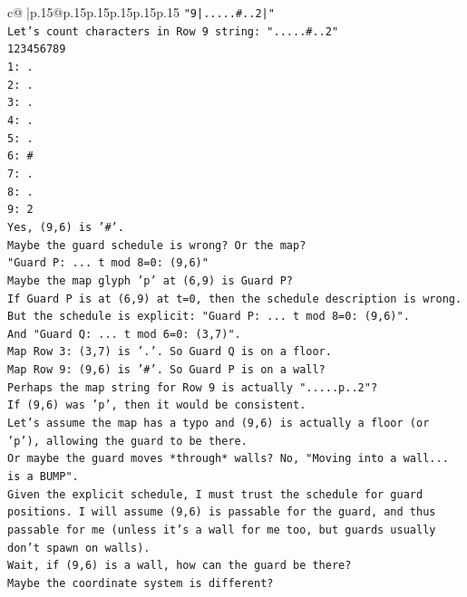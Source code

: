 \documentclass{article}
\begin{document}
{\begin{supertabular}{c@{$\;$}|p{.15\linewidth}@{}p{.15\linewidth}p{.15\linewidth}p{.15\linewidth}p{.15\linewidth}p{.15\linewidth}}
{{{\texttt{"9|.....\#..2|"} \\
\texttt{Let's count characters in Row 9 string: ".....\#..2"} \\
\texttt{123456789} \\
\texttt{1: .} \\
\texttt{2: .} \\
\texttt{3: .} \\
\texttt{4: .} \\
\texttt{5: .} \\
\texttt{6: \#} \\
\texttt{7: .} \\
\texttt{8: .} \\
\texttt{9: 2} \\
\texttt{Yes, (9,6) is '\#'.} \\
\texttt{Maybe the guard schedule is wrong? Or the map?} \\
\texttt{"Guard P: ... t mod 8=0: (9,6)"} \\
\texttt{Maybe the map glyph 'p' at (6,9) is Guard P?} \\
\texttt{If Guard P is at (6,9) at t=0, then the schedule description is wrong.} \\
\texttt{But the schedule is explicit: "Guard P: ... t mod 8=0: (9,6)".} \\
\texttt{And "Guard Q: ... t mod 6=0: (3,7)".} \\
\texttt{Map Row 3: (3,7) is '.'. So Guard Q is on a floor.} \\
\texttt{Map Row 9: (9,6) is '\#'. So Guard P is on a wall?} \\
\texttt{Perhaps the map string for Row 9 is actually ".....p..2"?} \\
\texttt{If (9,6) was 'p', then it would be consistent.} \\
\texttt{Let's assume the map has a typo and (9,6) is actually a floor (or 'p'), allowing the guard to be there.} \\
\texttt{Or maybe the guard moves *through* walls? No, "Moving into a wall... is a BUMP".} \\
\texttt{Given the explicit schedule, I must trust the schedule for guard positions. I will assume (9,6) is passable for the guard, and thus passable for me (unless it's a wall for me too, but guards usually don't spawn on walls).} \\
\texttt{Wait, if (9,6) is a wall, how can the guard be there?} \\
\texttt{Maybe the coordinate system is different?} \\
}}}
\end{supertabular}}
\end{document}
